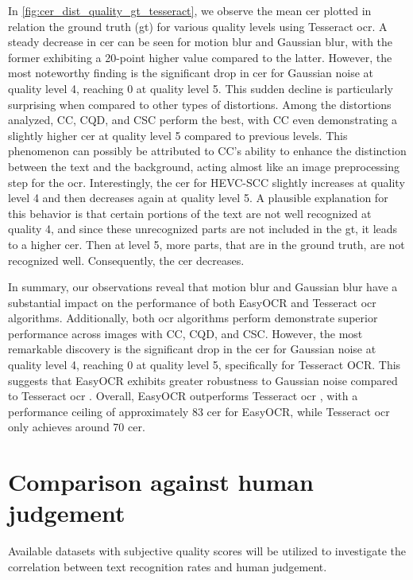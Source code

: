 In \autoref{fig:cer_dist_quality_gt_tesseract}, we observe the mean \gls{cer} plotted in relation the ground truth (\gls{gt}) for various quality levels using Tesseract \gls{ocr}.
A steady decrease in \gls{cer} can be seen for motion blur and Gaussian blur, with the former exhibiting a 20-point higher value compared to the latter.
However, the most noteworthy finding is the significant drop in \gls{cer} for Gaussian noise at quality level 4, reaching 0 at quality level 5.
This sudden decline is particularly surprising when compared to other types of distortions.
Among the distortions analyzed, CC, CQD, and CSC perform the best, with CC even demonstrating a slightly higher \gls{cer} at quality level 5 compared to previous levels.
This phenomenon can possibly be attributed to CC's ability to enhance the distinction between the text and the background, acting almost like an image preprocessing step for the \gls{ocr}.
Interestingly, the \gls{cer} for HEVC-SCC slightly increases at quality level 4 and then decreases again at quality level 5.
A plausible explanation for this behavior is that certain portions of the text are not well recognized at quality 4, and since these unrecognized parts are not included in the \gls{gt}, it leads to a higher \gls{cer}.
Then at level 5, more parts, that are in the ground truth, are not recognized well.
Consequently, the \gls{cer} decreases.

In summary, our observations reveal that motion blur and Gaussian blur have a substantial impact on the performance of both EasyOCR and Tesseract \gls{ocr} algorithms.
Additionally, both \gls{ocr} algorithms perform demonstrate superior performance across images with CC, CQD, and CSC.
However, the most remarkable discovery is the significant drop in the \gls{cer} for Gaussian noise at quality level 4, reaching 0 at quality level 5, specifically for Tesseract OCR.
This suggests that EasyOCR exhibits greater robustness to Gaussian noise compared to Tesseract \gls{ocr} .
Overall, EasyOCR outperforms Tesseract \gls{ocr} , with a performance ceiling of approximately 83 \gls{cer} for EasyOCR, while Tesseract \gls{ocr} only achieves around 70 \gls{cer}.

\section{Comparison against human judgement}
\label{sec:comparison_against_human_judgement}

Available datasets with subjective quality scores will be utilized to investigate
the correlation between text recognition rates and human judgement.

